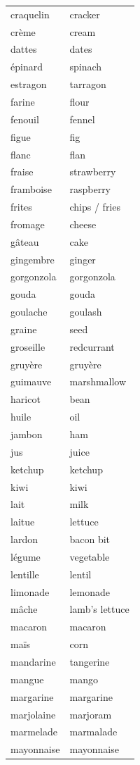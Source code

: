 \documentclass[12pt,a4paper]{article}
\begin{document}
\begin{longtable}{p{4cm} p{6cm}}
craquelin & cracker \\
crème & cream \\
dattes & dates \\
épinard & spinach \\
estragon & tarragon \\
farine & flour \\
fenouil & fennel \\
figue & fig \\
flanc & flan \\
fraise & strawberry \\
framboise & raspberry \\
frites & chips / fries \\
fromage & cheese \\
gâteau & cake \\
gingembre & ginger \\
gorgonzola & gorgonzola \\
gouda & gouda \\
goulache & goulash \\
graine & seed \\
groseille & redcurrant \\
gruyère & gruyère \\
guimauve & marshmallow \\
haricot & bean \\
huile & oil \\
jambon & ham \\
jus & juice \\
ketchup & ketchup \\
kiwi & kiwi \\
lait & milk \\
laitue & lettuce \\
lardon & bacon bit \\
légume & vegetable \\
lentille & lentil \\
limonade & lemonade \\
mâche & lamb's lettuce \\
macaron & macaron \\
maïs & corn \\
mandarine & tangerine \\
mangue & mango \\
margarine & margarine \\
marjolaine & marjoram \\
marmelade & marmalade \\
mayonnaise & mayonnaise \\

\end{longtable}
\end{document}
